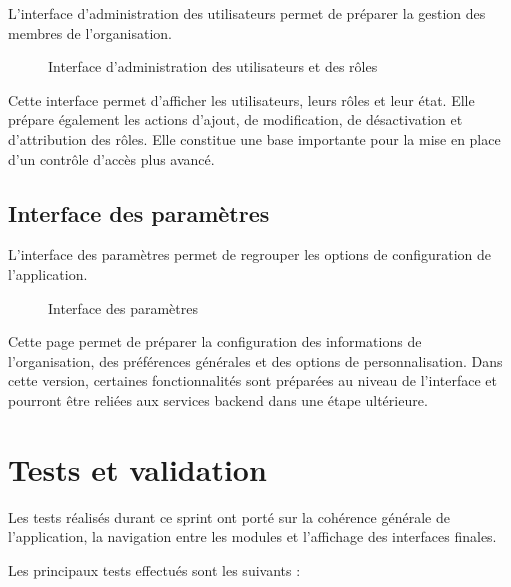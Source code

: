 \documentclass[12pt,a4paper]{report}
\begin{document}
L’interface d’administration des utilisateurs permet de préparer la gestion des membres de l’organisation.

\begin{figure}[h]
    \centering
    \caption{Interface d’administration des utilisateurs et des rôles}
    \label{fig:interface_users_roles}
\end{figure}

Cette interface permet d’afficher les utilisateurs, leurs rôles et leur état. Elle prépare également les actions d’ajout, de modification, de désactivation et d’attribution des rôles. Elle constitue une base importante pour la mise en place d’un contrôle d’accès plus avancé.

\subsection{Interface des paramètres}

L’interface des paramètres permet de regrouper les options de configuration de l’application.

\begin{figure}[h]
    \centering
    \caption{Interface des paramètres}
    \label{fig:interface_settings}
\end{figure}

Cette page permet de préparer la configuration des informations de l’organisation, des préférences générales et des options de personnalisation. Dans cette version, certaines fonctionnalités sont préparées au niveau de l’interface et pourront être reliées aux services backend dans une étape ultérieure.

\section{Tests et validation}

Les tests réalisés durant ce sprint ont porté sur la cohérence générale de l’application, la navigation entre les modules et l’affichage des interfaces finales.

Les principaux tests effectués sont les suivants :
\end{document}
